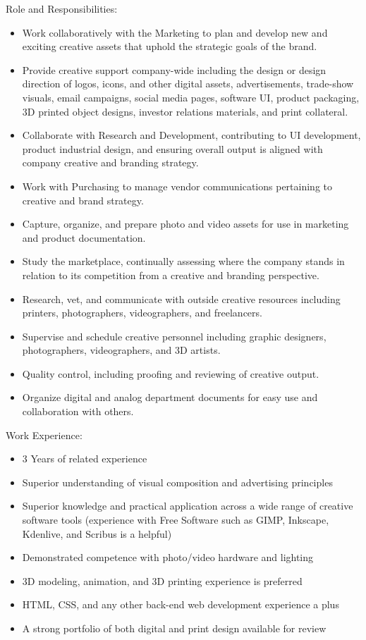 Role and Responsibilities:
\begin{itemize}
 \item Work collaboratively with the Marketing to plan and develop new and exciting creative assets that uphold the strategic goals of the brand.
 \item Provide creative support company-wide including the design or design direction of logos, icons, and other digital assets, advertisements, trade-show visuals, email campaigns, social media pages, software UI, product packaging, 3D printed object designs, investor relations materials, and print collateral.
 \item Collaborate with Research and Development, contributing to UI development, product industrial design, and ensuring overall output is aligned with company creative and branding strategy. 
 \item Work with Purchasing to manage vendor communications pertaining to creative and brand strategy.
 \item Capture, organize, and prepare photo and video assets for use in marketing and product documentation.
 \item Study the marketplace, continually assessing where the company stands in relation to its competition from a creative and branding perspective.
 \item Research, vet, and communicate with outside creative resources including printers, photographers, videographers, and freelancers.
 \item Supervise and schedule creative personnel including graphic designers, photographers, videographers, and 3D artists.
 \item Quality control, including proofing and reviewing of creative output.
 \item Organize digital and analog department documents for easy use and collaboration with others.
\end{itemize}

Work Experience:
\begin{itemize}
 \item 3 Years of related experience
 \item Superior understanding of visual composition and advertising principles
 \item Superior knowledge and practical application across a wide range of creative software tools (experience with Free Software such as GIMP, Inkscape, Kdenlive, and Scribus is a helpful) 
 \item Demonstrated competence with photo/video hardware and lighting
 \item 3D modeling, animation, and 3D printing experience is preferred
 \item HTML, CSS, and any other back-end web development experience a plus
 \item A strong portfolio of both digital and print design available for review
\end{itemize}

